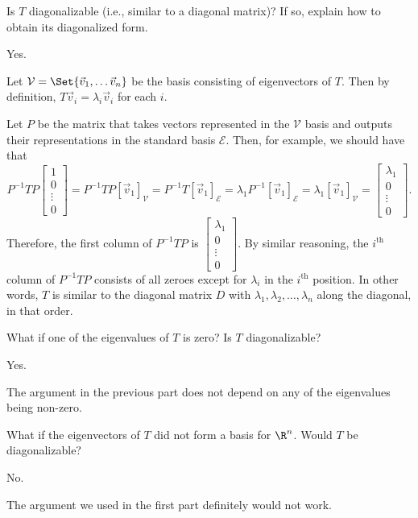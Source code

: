 \documentclass{problemset}
\newcommand{\matc}[1]{\begin{bmatrix}#1\end{bmatrix}}
\begin{document}
	\begin{parts}
		\item Is $T$ diagonalizable (i.e., similar to a diagonal matrix)?  If so, explain how to obtain its diagonalized form.
		\begin{solution}
			Yes. 

			Let $\mathcal V=\Set{\vec v_1,\ldots \vec v_n}$ be the basis consisting
			of eigenvectors of $T$. Then by definition, $T\vec v_i=\lambda_i\vec v_i$
			for each $i$. 

			Let $P$ be the matrix that takes vectors represented in the
			$\mathcal V$ basis and outputs their representations in the standard
			basis $\mathcal E$. Then, for example, we should have that
			\[
				P^{-1}TP\matc{1\\0\\\vdots\\0}
				=P^{-1}TP[\vec v_1]_{\mathcal V}
				=P^{-1}T[\vec v_1]_{\mathcal E}
				=\lambda_1P^{-1}[\vec v_1]_{\mathcal E}
				=\lambda_1[\vec v_1]_{\mathcal V}
				=\matc{\lambda_1\\0\\\vdots\\0}.
			\]
			Therefore, the first column of $P^{-1}TP$ is $\matc{\lambda_1\\0\\\vdots\\0}$.
			By similar reasoning, the $i^\text{th}$ column of $P^{-1}TP$ consists
			of all zeroes except for $\lambda_i$ in the $i^\text{th}$ position. 
			In other words, $T$ is similar to the diagonal matrix $D$ with 
			$\lambda_1, \lambda_2, \dots, \lambda_n$ along the diagonal, in that
			order. 
		\end{solution}
		\item What if one of the eigenvalues of $T$ is zero?  Is $T$ diagonalizable?
			\begin{solution}
				Yes. 

				The argument in the previous part does not depend on any of the
				eigenvalues being non-zero.
			\end{solution}
		\item What if the eigenvectors of $T$ did not form a basis for $\R^n$.
			Would $T$ be diagonalizable?
			\begin{solution}
				No. 

				The argument we used in the first part definitely would not work.


\end{solution}
\end{parts}
\end{document}
